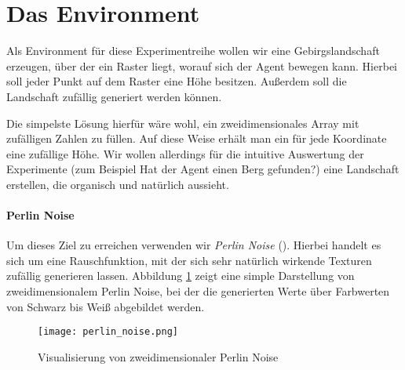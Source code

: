 \section{Das Environment}

Als Environment für diese Experimentreihe wollen wir eine Gebirgslandschaft erzeugen, über der ein Raster liegt, worauf sich der Agent bewegen kann. Hierbei soll jeder Punkt auf dem Raster eine Höhe besitzen. Außerdem soll die Landschaft zufällig generiert werden können.

Die simpelste Lösung hierfür wäre wohl, ein zweidimensionales Array mit zufälligen Zahlen zu füllen. Auf diese Weise erhält man ein für jede Koordinate eine zufällige Höhe. Wir wollen allerdings für die intuitive Auswertung der Experimente (zum Beispiel \glqq Hat der Agent einen Berg gefunden?\grqq) eine Landschaft erstellen, die organisch und natürlich aussieht.

\paragraph{Perlin Noise}
Um dieses Ziel zu erreichen verwenden wir \textit{Perlin Noise} (\cite{parberry2015modeling}). Hierbei handelt es sich um eine Rauschfunktion, mit der sich sehr natürlich wirkende Texturen zufällig generieren lassen. Abbildung \ref{img:perlinNoise} zeigt eine simple Darstellung von zweidimensionalem Perlin Noise, bei der die generierten Werte über Farbwerten von Schwarz bis Weiß abgebildet werden.

\begin{figure}[H]
    \centering
    \texttt{[image: perlin\_noise.png]}
    \caption{Visualisierung von zweidimensionaler Perlin Noise} \label{img:perlinNoise}
\end{figure}



